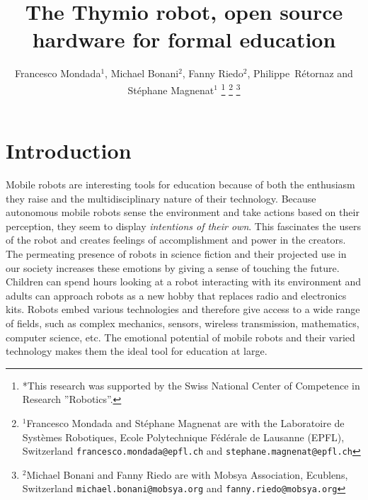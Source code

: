 \documentclass[letterpaper, 10 pt, conference]{ieeeconf}  %
\title{\LARGE \bf
The Thymio robot, open source hardware for formal education
}
\author{Francesco Mondada$^{1}$, Michael Bonani$^{2}$, Fanny Riedo$^{2}$, Philippe~Rétornaz and Stéphane Magnenat$^{1}$%
\thanks{*This research was supported by the Swiss National Center of Competence in Research ”Robotics”.}%
\thanks{$^{1}$Francesco Mondada and Stéphane Magnenat are with the Laboratoire de Syst\`emes Robotiques,
        Ecole Polytechnique F\'ed\'erale de Lausanne (EPFL), Switzerland
        {\tt\small francesco.mondada@epfl.ch} and {\tt\small stephane.magnenat@epfl.ch}}%
\thanks{$^{2}$Michael Bonani and Fanny Riedo are with Mobsya Association, Ecublens, Switzerland
        {\tt\small michael.bonani@mobsya.org} and {\tt\small fanny.riedo@mobsya.org}}%
}
\begin{document}
\maketitle
\thispagestyle{empty}
\pagestyle{empty}





\section{Introduction}

Mobile robots are interesting tools for education because of both the enthusiasm they raise and the multidisciplinary nature of their technology.
Because autonomous mobile robots sense the environment and take actions based on their perception, they seem to display \emph{intentions of their own}.
This fascinates the users of the robot and creates feelings of accomplishment and power in the creators.
The permeating presence of robots in science fiction and their projected use in our society increases these emotions by giving a sense of touching the future. %
Children can spend hours looking at a robot interacting with its environment and adults can approach robots as a new hobby that replaces radio and electronics kits.
Robots embed various technologies and therefore give access to a wide range of fields, such as complex mechanics, sensors, wireless transmission, mathematics, computer science, etc.
The emotional potential of mobile robots and their varied technology makes them the ideal tool for education at large.
\end{document}
